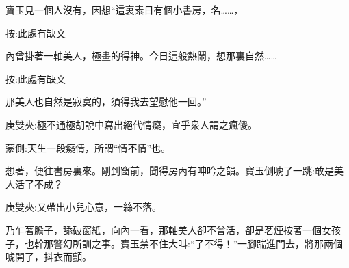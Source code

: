 \begin{parag}
    寶玉見一個人沒有，因想“這裏素日有個小書房，名……，\begin{subnote}按:此處有缺文\end{subnote}內曾掛著一軸美人，極畫的得神。今日這般熱鬧，想那裏自然……\begin{subnote}按:此處有缺文\end{subnote}那美人也自然是寂寞的，須得我去望慰他一回。”\begin{note}庚雙夾:極不通極胡說中寫出絕代情癡，宜乎衆人謂之瘋傻。\end{note}\begin{note}蒙側:天生一段癡情，所謂“情不情”也。\end{note}想著，便往書房裏來。剛到窗前，聞得房內有呻吟之韻。寶玉倒唬了一跳:敢是美人活了不成？\begin{note}庚雙夾:又帶出小兒心意，一絲不落。\end{note}乃乍著膽子，舔破窗紙，向內一看，那軸美人卻不曾活，卻是茗煙按著一個女孩子，也幹那警幻所訓之事。寶玉禁不住大叫:“了不得！”一腳踹進門去，將那兩個唬開了，抖衣而顫。
\end{parag}


